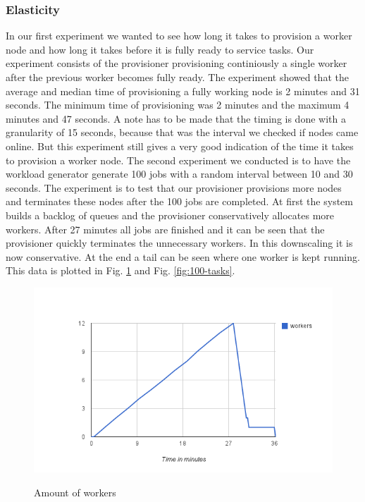 \documentclass[a4paper]{IEEEtran}
\begin{document}
\subsubsection{Elasticity}
In our first experiment we wanted to see how long it takes to provision a worker node and how long it takes before it is fully ready to service tasks.
Our experiment consists of the provisioner provisioning continiously a single worker after the previous worker becomes fully ready.
The experiment showed that the average and median time of provisioning a fully working node is 2 minutes and 31 seconds.
The minimum time of provisioning was 2 minutes and the maximum 4 minutes and 47 seconds.
A note has to be made that the timing is done with a granularity of 15 seconds, because that was the interval we checked if nodes came online.
But this experiment still gives a very good indication of the time it takes to provision a worker node.
The second experiment we conducted is to have the workload generator generate 100 jobs with a random interval between 10 and 30 seconds.
The experiment is to test that our provisioner provisions more nodes and terminates these nodes after the 100 jobs are completed.
At first the system builds a backlog of queues and the provisioner conservatively allocates more workers.
After 27 minutes all jobs are finished and it can be seen that the provisioner quickly terminates the unnecessary workers.
In this downscaling it is now conservative.
At the end a tail can be seen where one worker is kept running.
This data is plotted in Fig. \ref{fig:100-workers} and Fig. \ref{fig:100-tasks}.

\begin{figure}[ht]
	\includegraphics[scale=0.5]{fig/100workers.png}
	\label{fig:100-workers}
	\caption{Amount of workers}
\end{figure}
\end{document}
